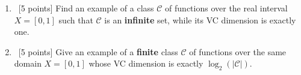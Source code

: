 \begin{enumerate}
\begin{enumerate}
  \item ~[5 points] Find an example of a class $\mathcal{C}$ of
    functions over the real interval $X = [0,1]$ such that
    $\mathcal{C}$ is an {\bf infinite} set, while its VC dimension is
    exactly one.

  \item ~[5 points] Give an example of a {\bf finite} class
    $\mathcal{C}$ of functions over the same domain $X = [0,1]$ whose
    VC dimension is exactly $\log_2(|\mathcal{C}|)$.

  \end{enumerate}
  
\end{enumerate}
